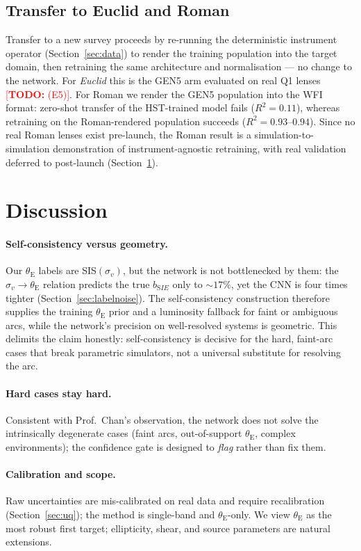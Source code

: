 \documentclass[fleqn,usenatbib]{mnras}
\newcommand{\thetaE}{\theta_{\mathrm{E}}}
\newcommand{\sigmav}{\sigma_{v}}
\newcommand{\bsie}{b_{\mathrm SIE}}
\newcommand{\todo}[1]{\textcolor{red}{[\textbf{TODO:} #1]}}
\begin{document}
\subsection{Transfer to Euclid and Roman}
\label{sec:transfer}
Transfer to a new survey proceeds by re-running the deterministic instrument
operator (Section~\ref{sec:data}) to render the training population into the
target domain, then retraining the same architecture and normalisation --- no
change to the network. For \textit{Euclid} this is the GEN5 arm evaluated on
real Q1 lenses \todo{(E5)}. For Roman we render the GEN5 population into the WFI
format: zero-shot transfer of the HST-trained model fails ($R^2=0.11$), whereas
retraining on the Roman-rendered population succeeds ($R^2=0.93$--$0.94$). Since
no real Roman lenses exist pre-launch, the Roman result is a
simulation-to-simulation demonstration of instrument-agnostic retraining, with
real validation deferred to post-launch (Section~\ref{sec:discussion}).

\section{Discussion}
\label{sec:discussion}
\paragraph*{Self-consistency versus geometry.} Our $\thetaE$ labels are
SIS$(\sigmav)$, but the network is not bottlenecked by them: the
$\sigmav\!\rightarrow\!\thetaE$ relation predicts the true $\bsie$ only to
${\sim}17\%$, yet the CNN is four times tighter
(Section~\ref{sec:labelnoise}). The self-consistency construction therefore
supplies the training $\thetaE$ prior and a luminosity fallback for faint or
ambiguous arcs, while the network's precision on well-resolved systems is
geometric. This delimits the claim honestly: self-consistency is decisive for
the hard, faint-arc cases that break parametric simulators, not a universal
substitute for resolving the arc.
\paragraph*{Hard cases stay hard.} Consistent with Prof.\ Chan's observation,
the network does not solve the intrinsically degenerate cases (faint arcs,
out-of-support $\thetaE$, complex environments); the confidence gate is designed
to \emph{flag} rather than fix them.
\paragraph*{Calibration and scope.} Raw uncertainties are mis-calibrated on real
data and require recalibration (Section~\ref{sec:uq}); the method is
single-band and $\thetaE$-only. We view $\thetaE$ as the most robust first
target; ellipticity, shear, and source parameters are natural extensions.
\end{document}
